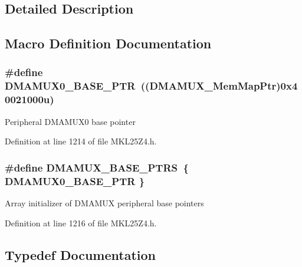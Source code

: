 \subsection{Detailed Description}


\subsection{Macro Definition Documentation}
\subsubsection[{\texorpdfstring{D\+M\+A\+M\+U\+X0\+\_\+\+B\+A\+S\+E\+\_\+\+P\+TR}{DMAMUX0_BASE_PTR}}]{\setlength{\rightskip}{0pt plus 5cm}\#define D\+M\+A\+M\+U\+X0\+\_\+\+B\+A\+S\+E\+\_\+\+P\+TR~(({\bf D\+M\+A\+M\+U\+X\+\_\+\+Mem\+Map\+Ptr})0x40021000u)}\hypertarget{group___d_m_a_m_u_x___peripheral_ga403b61d306820e4e1113c636300004a3}{}\label{group___d_m_a_m_u_x___peripheral_ga403b61d306820e4e1113c636300004a3}
Peripheral D\+M\+A\+M\+U\+X0 base pointer 

Definition at line 1214 of file M\+K\+L25\+Z4.\+h.

\subsubsection[{\texorpdfstring{D\+M\+A\+M\+U\+X\+\_\+\+B\+A\+S\+E\+\_\+\+P\+T\+RS}{DMAMUX_BASE_PTRS}}]{\setlength{\rightskip}{0pt plus 5cm}\#define D\+M\+A\+M\+U\+X\+\_\+\+B\+A\+S\+E\+\_\+\+P\+T\+RS~\{ {\bf D\+M\+A\+M\+U\+X0\+\_\+\+B\+A\+S\+E\+\_\+\+P\+TR} \}}\hypertarget{group___d_m_a_m_u_x___peripheral_gaad218c12978071501dc2899f0624de4b}{}\label{group___d_m_a_m_u_x___peripheral_gaad218c12978071501dc2899f0624de4b}
Array initializer of D\+M\+A\+M\+UX peripheral base pointers 

Definition at line 1216 of file M\+K\+L25\+Z4.\+h.



\subsection{Typedef Documentation}
